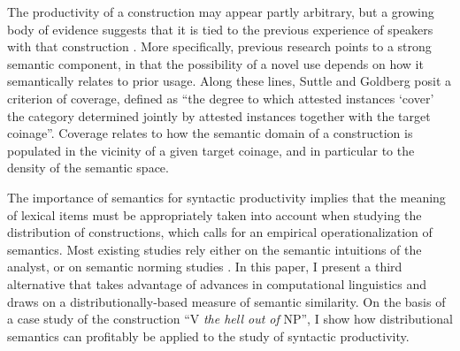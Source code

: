 \documentclass[11pt]{article}
\begin{document}
The productivity of a construction may appear partly arbitrary, but a growing body of evidence suggests that it is tied to the previous experience of speakers with that construction \cite{Barddal2008,BybeeEddington2006,SuttleGoldberg2011}. More specifically, previous research points to a strong semantic component, in that the possibility of a novel use depends on how it semantically relates to prior usage. Along these lines, Suttle and Goldberg  posit a criterion of coverage, defined as ``the degree to which attested instances `cover' the category determined jointly by attested instances together with the target coinage''. Coverage relates to how the semantic domain of a construction is populated in the vicinity of a given target coinage, and in particular to the density of the semantic space.


The importance of semantics for syntactic productivity implies that the meaning of lexical items must be appropriately taken into account when studying the distribution of constructions, which calls for an empirical operationalization of semantics. Most existing studies rely either on the semantic intuitions of the analyst, or on semantic norming studies \cite{BybeeEddington2006}. In this paper, I present a third alternative that takes advantage of advances in computational linguistics and draws on a distributionally-based measure of semantic similarity. On the basis of a case study of the construction ``V \textit{the hell out of} NP'', I show how distributional semantics can profitably be applied to the study of syntactic productivity.
\end{document}
